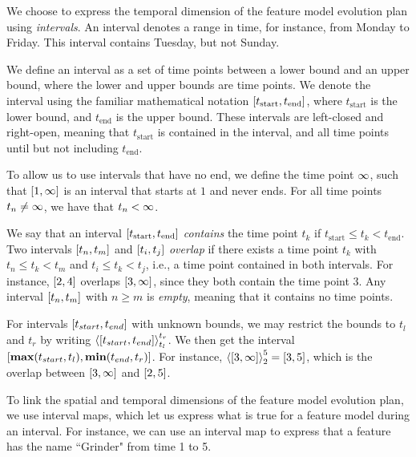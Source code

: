 We choose to express the temporal dimension of the feature model evolution plan using \emph{intervals}. An interval denotes a range in time, for instance, from Monday to Friday. This interval contains Tuesday, but not Sunday.
\\
\begin{definition}[Interval]
  We define an interval as a set of time points between a lower bound and an upper bound, where the lower and upper bounds are time points. We denote the interval using the familiar mathematical notation $\interval{t_\text{start}}{t_\text{end}}$, where $t_\text{start}$ is the lower bound, and $t_\text{end}$ is the upper bound. These intervals are left-closed and right-open, meaning that $t_\text{start}$ is contained in the interval, and all time points until but not including $t_\text{end}$.
  \label{def:interval}
\end{definition}

To allow us to use intervals that have no end, we define the time point $\infty$, such that $\interval{1}{\forever}$ is an interval that starts at $1$ and never ends. For all time points $t_n \neq \infty$, we have that $t_n < \infty$. 

We say that an interval $\interval{t_\text{start}}{t_\text{end}}$ \emph{contains} the time point $t_k$ if $t_\text{start} \leq t_k < t_\text{end}$. Two intervals $\interval{t_n}{t_m}$ and $\interval{t_i}{t_j}$ \emph{overlap} if there exists a time point $t_k$ with $t_n \leq t_k < t_m$ and $t_i \leq t_k < t_j$, i.e., a time point contained in both intervals. For instance, $\interval{2}{4}$ overlaps $\interval{3}{\forever}$, since they both contain the time point 3. Any interval $\interval{t_n}{t_m}$ with $n \geq m$ is \emph{empty}, meaning that it contains no time points.

For intervals $\interval{t_{start}}{t_{end}}$ with unknown bounds, we may restrict the bounds to $t_l$ and $t_r$ by writing $\clamp{\interval{t_{start}}{t_{end}}}{t_l}{t_r}$. We then get the interval $\interval{\textbf{max}(t_{start}, t_l)}{\textbf{min}(t_{end}, t_r)}$. For instance, $\clamp{\interval{3}{\forever}}{2}{5} = \interval{3}{5}$, which is the overlap between $\interval{3}{\forever}$ and $\interval{2}{5}$.


To link the spatial and temporal dimensions of the feature model evolution plan, we use interval maps, which let us express what is true for a feature model during an interval. For instance, we can use an interval map to express that a feature has the name ``Grinder" from time 1 to 5.
\\

